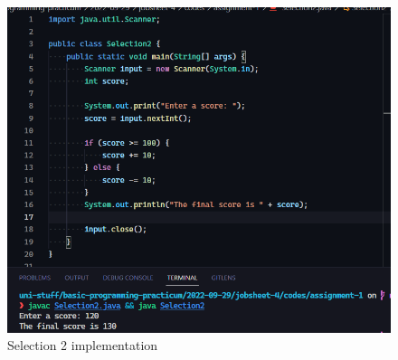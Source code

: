 \documentclass[12pt,titlepage]{article}
\begin{document}
\begin{enumerate}
{        \begin{figure}[h]
            \centering
            \includegraphics[width=.8\textwidth]{./images/selection-2.png}
            \caption{Selection 2 implementation}
        \end{figure}
    }
\end{enumerate}
\end{document}
